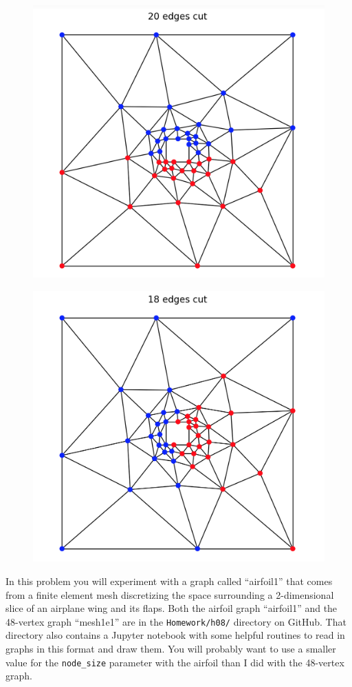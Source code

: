 \documentclass[11pt]{article}
\begin{document}
\begin{figure}[h]
\centering
\begin{minipage}{.5\textwidth}
  \centering
  \includegraphics[width=.65\linewidth]{geometric20}
  \label{fig:geometric}
\end{minipage}%
\begin{minipage}{.5\textwidth}
  \centering
  \includegraphics[width=.65\linewidth]{spectral18}
  \label{fig:spectral}
\end{minipage}
\end{figure}

In this problem you will experiment with a graph called ``airfoil1''
that comes from a finite element mesh discretizing the space surrounding 
a 2-dimensional slice of an airplane wing and its flaps.
Both the airfoil graph ``airfoil1'' and the 48-vertex graph ``mesh1e1'' are in
the {\tt Homework/h08/} directory on GitHub.
That directory also contains a Jupyter notebook with some helpful routines to
read in graphs in this format and draw them.
You will probably want to use a smaller value for the {\tt node\_size} 
parameter with the airfoil than I did with the 48-vertex graph.
\end{document}
